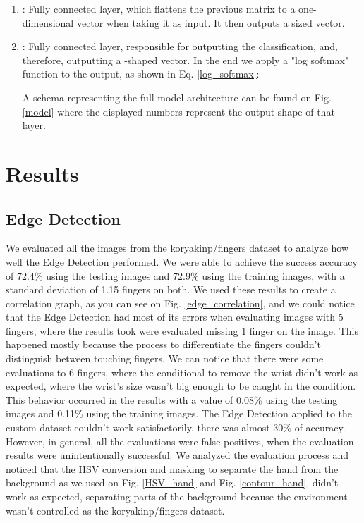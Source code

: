 \documentclass[conference]{IEEEtran}
\begin{document}
\begin{enumerate}
    \item : Fully connected layer, which flattens the previous  matrix to a one-dimensional vector when taking it as input. It then outputs a  sized vector.
    \item : Fully connected layer, responsible for outputting the classification, and, therefore, outputting a -shaped vector. In the end we apply a "log softmax" function to the output, as shown in Eq. \ref{log_softmax}:
    
    
    
A schema representing the full model architecture can be found on Fig. \ref{model} where the displayed numbers represent the output shape of that layer.
    
\end{enumerate}

\section{Results}
\subsection{Edge Detection}
We evaluated all the images from the koryakinp/fingers dataset to analyze how well the Edge Detection performed. We were able to achieve the success accuracy of 72.4\% using the testing images and 72.9\% using the training images, with a standard deviation of 1.15 fingers on both. 
We used these results to create a correlation graph, as you can see on Fig. \ref{edge_correlation}, and we could notice that the Edge Detection had most of its errors when evaluating images with 5 fingers, where the results took were evaluated missing 1 finger on the image. This happened mostly because the process to differentiate the fingers couldn't distinguish between touching fingers. 
We can notice that there were some evaluations to 6 fingers, where the conditional to remove the wrist didn't work as expected, where the wrist's size wasn't big enough to be caught in the condition. This behavior occurred in the results with a value of 0.08\% using the testing images and 0.11\% using the training images.
The Edge Detection applied to the custom dataset couldn't work satisfactorily, there was almost 30\% of accuracy. However, in general, all the evaluations were false positives, when the evaluation results were unintentionally successful. We analyzed the evaluation process and noticed that the HSV conversion and masking to separate the hand from the background as we used on Fig. \ref{HSV_hand} and Fig. \ref{contour_hand}, didn't work as expected, separating parts of the background because the environment wasn't controlled as the koryakinp/fingers dataset.
\end{document}

